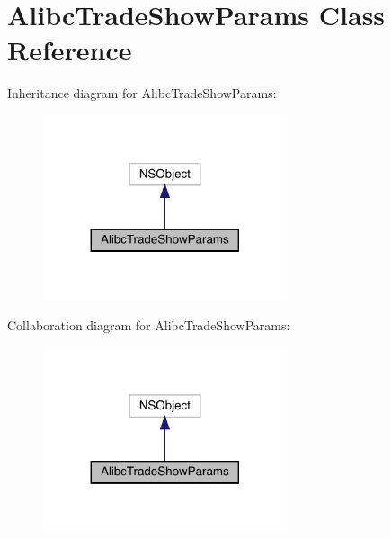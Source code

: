 \hypertarget{interface_alibc_trade_show_params}{}\section{Alibc\+Trade\+Show\+Params Class Reference}
\label{interface_alibc_trade_show_params}


Inheritance diagram for Alibc\+Trade\+Show\+Params\+:\nopagebreak
\begin{figure}[H]
\begin{center}
\leavevmode
\includegraphics[width=203pt]{interface_alibc_trade_show_params__inherit__graph}
\end{center}
\end{figure}


Collaboration diagram for Alibc\+Trade\+Show\+Params\+:\nopagebreak
\begin{figure}[H]
\begin{center}
\leavevmode
\includegraphics[width=203pt]{interface_alibc_trade_show_params__coll__graph}
\end{center}
\end{figure}

